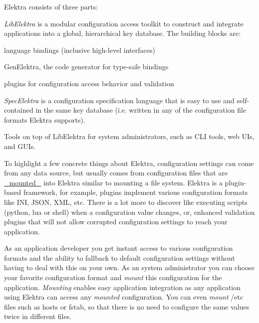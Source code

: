Elektra consists of three parts\+:


\begin{DoxyEnumerate}
\item {\itshape Lib\+Elektra} is a modular configuration access toolkit to construct and integrate applications into a global, hierarchical key database. The building blocks are\+:
\begin{DoxyItemize}
\item language bindings (inclusive high-\/level interfaces)
\item Gen\+Elektra, the code generator for type-\/safe bindings
\item plugins for configuration access behavior and validation
\end{DoxyItemize}
\item {\itshape Spec\+Elektra} is a configuration specification language that is easy to use and self-\/contained in the same key database (i.\+e. written in any of the configuration file formats Elektra supports).
\item Tools on top of Lib\+Elektra for system administrators, such as C\+LI tools, web U\+Is, and G\+U\+Is.
\end{DoxyEnumerate}

To highlight a few concrete things about Elektra, configuration settings can come from any data source, but usually comes from configuration files that are \hyperlink{doc_help_elektra-mounting_md}{\+\_\+mounted\+\_\+} into Elektra similar to mounting a file system. Elektra is a plugin-\/based framework, for example, plugins implement various configuration formats like I\+NI, J\+S\+ON, X\+ML, etc. There is a lot more to discover like executing scripts ({\ttfamily python}, {\ttfamily lua} or {\ttfamily shell}) when a configuration value changes, or, enhanced validation plugins that will not allow corrupted configuration settings to reach your application.

As an application developer you get instant access to various configuration formats and the ability to fallback to default configuration settings without having to deal with this on your own. As an system administrator you can choose your favorite configuration format and {\itshape mount} this configuration for the application. {\itshape Mounting} enables easy application integration as any application using Elektra can access any {\itshape mounted} configuration. You can even {\itshape mount} {\ttfamily /etc} files such as {\ttfamily hosts} or {\ttfamily fstab}, so that there is no need to configure the same values twice in different files.

